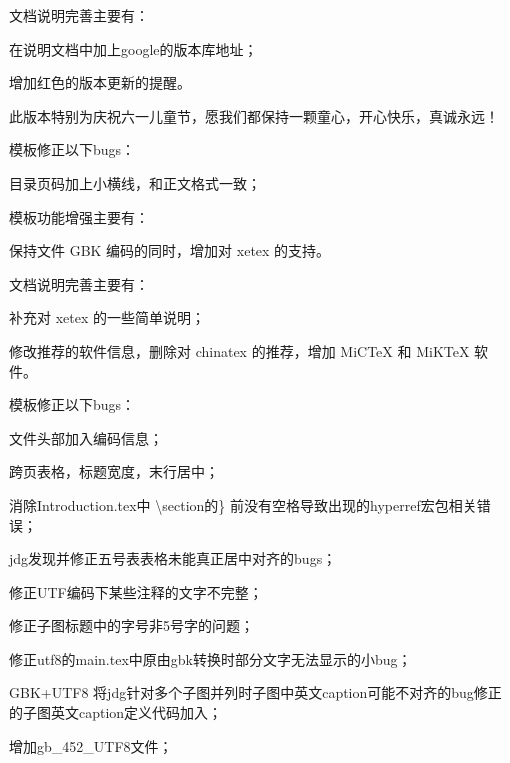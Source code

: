 文档说明完善主要有：
\begin{hitlist}
   \item 在说明文档中加上google的版本库地址；
   \item 增加红色的版本更新的提醒。
\end{hitlist}


此版本特别为庆祝六一儿童节，愿我们都保持一颗童心，开心快乐，真诚永远！

模板修正以下bugs：
\begin{hitlist}
    \item 目录页码加上小横线，和正文格式一致；
\end{hitlist}


模板功能增强主要有：
\begin{hitlist}
    \item 保持文件 GBK 编码的同时，增加对 xetex 的支持。
\end{hitlist}

文档说明完善主要有：
\begin{hitlist}
   \item 补充对 xetex 的一些简单说明；
   \item 修改推荐的软件信息，删除对 chinatex 的推荐，增加 MiCTeX 和 MiKTeX 软件。
\end{hitlist}

模板修正以下bugs：
\begin{hitlist}
    \item 文件头部加入编码信息；
    \item 跨页表格，标题宽度，末行居中；
    \item 消除Introduction.tex中 \textbackslash section的\} 前没有空格导致出现的hyperref宏包相关错误； 
    \item jdg发现并修正五号表表格未能真正居中对齐的bugs；
    \item 修正UTF编码下某些注释的文字不完整；
    \item 修正子图标题中的字号非5号字的问题； 
    \item 修正utf8的main.tex中原由gbk转换时部分文字无法显示的小bug；
    \item [GBK+UTF8]将jdg针对多个子图并列时子图中英文caption可能不对齐的bug修正的子图英文caption定义代码加入；
    \item 增加gb\_452\_UTF8文件；
\end{hitlist}


